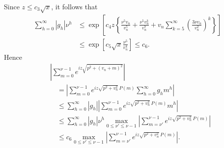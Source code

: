 \documentclass[11pt]{article}
\begin{document}
Since $z\leq c_3\sqrt{x}$, it follows that
\begin{align*}
 \sum_{h=0}^{\infty}|g_h|\nu^h
 &\leq\exp\left[c_4z\left\{
 \frac{\nu^5v_n}{v_n^5}+\frac{\nu^5v_n^3}{v_n^7}
 +v_n\sum_{k=5}^{\infty}\left(\frac{3\nu v_n}{v_n^2}\right)^k
 \right\}\right] \\
 &\leq\exp\left[c_5\sqrt{x}\frac{\nu^5}{v_n^4}\right]\leq c_6.
\end{align*}
Hence
\begin{align*}
&\left|\sum_{m=0}^{\nu-1}e^{iz\sqrt{p^2+(v_n+m)^2}}\right| \\
&\quad=\left|\sum_{m=0}^{\nu-1}e^{iz\sqrt{p^2+v_n^2}\,P(m)}
 \sum_{h=0}^{\infty}g_hm^h\right| \\
&\quad\leq\sum_{h=0}^{\infty}|g_h|
 \left|\sum_{m=0}^{\nu-1}e^{iz\sqrt{p^2+v_n^2}\,P(m)}m^h\right| \\
&\quad\leq\sum_{h=0}^{\infty}|g_h|\nu^h
 \max_{0\leq\nu'\leq\nu-1}
 \left|\sum_{m=\nu'}^{\nu-1}e^{iz\sqrt{p^2+v_n^2}\,P(m)}\right| \\
&\quad\leq c_6\max_{0\leq\nu'\leq\nu-1}
 \left|\sum_{m=\nu'}^{\nu-1}e^{iz\sqrt{p^2+v_n^2}\,P(m)}\right|.
\tag{5.5}
\end{align*}
\end{document}
